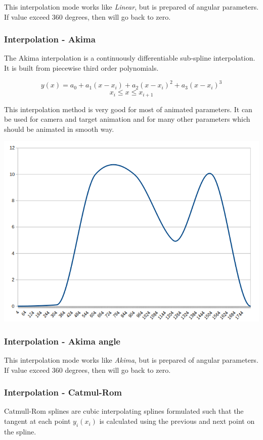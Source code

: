 This interpolation mode works like \emph{Linear}, but is prepared of angular
parameters. If value exceed 360 degrees, then will go back to zero.

\subsubsection{Interpolation - Akima}\label{interpolation-akima}

The Akima interpolation is a continuously differentiable sub-spline
interpolation. It is built from piecewise third order polynomials.

\[ y(x) = a_0 + a_1 (x - x_i) + a_2 (x - x_i)^2 + a_3 (x - x_i)^3\] \[x_i  \leq
x \leq x_{i+1}\]

This interpolation method is very good for most of animated parameters. It can
be used for camera and target animation and for many other parameters which
should be animated in smooth way.

\includegraphics[width=0.5\linewidth]{img/manual/media/interpolation_akima.png}

\subsubsection{Interpolation - Akima angle}\label{interpolation-akima-angle}

This interpolation mode works like \emph{Akima}, but is prepared of angular
parameters. If value exceed 360 degrees, then will go back to zero.

\subsubsection{Interpolation - Catmul-Rom}\label{interpolation-catmul-rom}

Catmull-Rom splines are cubic interpolating splines formulated such that the
tangent at each point $ y_i(x_i) $ is calculated using the previous and next
point on the spline.

